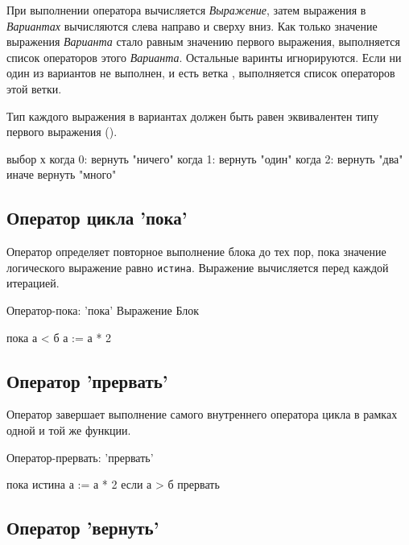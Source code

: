 При выполнении оператора  вычисляется \emph{Выражение},
затем выражения в \emph{Вариантах} вычисляются слева направо и сверху вниз. 
Как только значение выражения \emph{Варианта} стало равным значению первого выражения, выполняется список операторов этого \emph{Варианта}.
Остальные варинты игнорируются.
Если ни один из вариантов не выполнен, и есть ветка , выполняется список операторов этой ветки.

Тип каждого выражения в вариантах должен быть равен эквивалентен типу первого выражения ().

\begin{Trivil}
выбор х {
когда 0: вернуть "ничего"
когда 1: вернуть "один"
когда 2: вернуть "два"
иначе вернуть "много"
}
\end{Trivil}


\hypertarget{while-stmt}{%
\subsection{Оператор цикла 'пока' }\label{stmt:while-stmt}}

Оператор  определяет повторное выполнение блока до тех пор, пока значение логического выражение равно \verb+истина+. 
Выражение вычисляется перед каждой итерацией.

\begin{Grammar}
Оператор-пока: 'пока' Выражение Блок 
\end{Grammar}

\begin{Trivil}
пока а < б {
    а := а * 2
}
\end{Trivil}

\hypertarget{break-stmt}{%
\subsection{Оператор 'прервать'}\label{stmt:break-stmt}}

Оператор  завершает выполнение самого внутреннего оператора цикла в рамках одной и той же функции.

\begin{Grammar}
Оператор-прервать: 'прервать' 
\end{Grammar}

\begin{Trivil}
пока истина {
    а := а * 2
    если а > б { прервать }
}
\end{Trivil}

\hypertarget{return-stmt}{%
\subsection{Оператор 'вернуть'}\label{stmt:return-stmt}}

